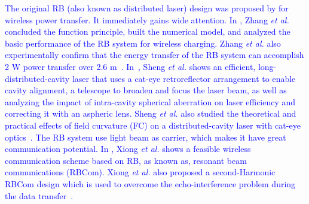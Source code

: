 \documentclass{IEEEtran}
\begin{document}
\textcolor{blue}{The original RB (also known as distributed laser) design was proposed by \cite{9653949} for wireless power transfer. It immediately gains wide attention. In \cite{zhang2018distributed}, Zhang \emph{et al.} concluded the function principle, built the numerical model, and analyzed the basic performance of the RB system for wireless charging.
Zhang \emph{et al.} also experimentally confirm that the energy transfer of the RB system can accomplish 2 W power transfer over 2.6 m~\cite{wang2019wireless}. 
In~\cite{Sheng21}, Sheng \emph{et al.} shows an efficient, long-distributed-cavity laser that uses a cat-eye retroreflector arrangement to enable cavity alignment, a telescope to broaden and focus the laser beam, as well as analyzing the impact of intra-cavity spherical aberration on laser efficiency and correcting it with an aspheric lens.
Sheng \emph{et al.} also studied the theoretical and practical effects of field curvature (FC) on a distributed-cavity laser with cat-eye optics~\cite{SHENG2022108011}.
} %
\textcolor{blue}{The RB system use light beam as carrier, which makes it have great communication potential. 
In \cite{RBCom}, Xiong \emph{et al.} shows a feasible wireless communication scheme based on RB, as known as, resonant beam communications (RBCom). Xiong \emph{et al.} also proposed a second-Harmonic RBCom design which is used to overcome the echo-interference problem during the data transfer~\cite{xiongSHG}. 
}
\end{document}
